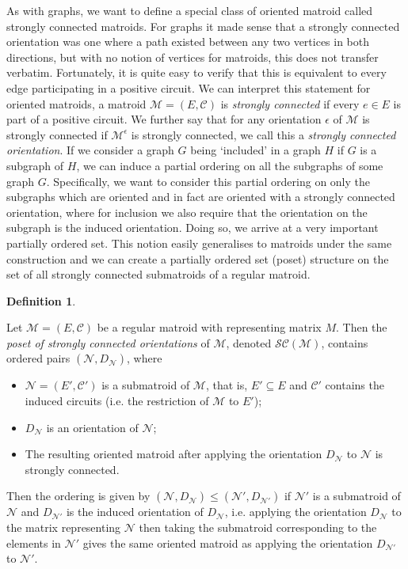 \documentclass[12pt]{report}
\theoremstyle{definition}
\newtheorem{definition}[theorem]{Definition}
\def\calC{\mathcal C}
\def\calM{\mathcal M}
\def\calN{\mathcal N}
\def\calS{\mathcal S}
\theoremstyle{upright}
\begin{document}
As with graphs, we want to define a special class of oriented matroid called strongly connected matroids.
For graphs it made sense that a strongly connected orientation was one where a path existed between any two vertices in both directions, but with no notion of vertices for matroids, this does not transfer verbatim.
Fortunately, it is quite easy to verify that this is equivalent to every edge participating in a positive circuit.
We can interpret this statement for oriented matroids, a matroid $\calM=(E, \calC)$ is {\em strongly connected} if every $e\in E$ is part of a positive circuit.
We further say that for any orientation $\epsilon$ of $\calM$ is strongly connected if $\calM^\epsilon$ is strongly connected, we call this a {\em strongly connected orientation}.
If we consider a graph $G$ being `included' in a graph $H$ if $G$ is a subgraph of $H$, we can induce a partial ordering on all the subgraphs of some graph $G$.
Specifically, we want to consider this partial ordering on only the subgraphs which are oriented and in fact are oriented with a strongly connected orientation, where for inclusion we also require that the orientation on the subgraph is the induced orientation.
Doing so, we arrive at a very important partially ordered set.
This notion easily generalises to matroids under the same construction and we can create a partially ordered set (poset) structure on the set of all strongly connected submatroids of a regular matroid.

\begin{definition}\label{def:SCPoset}

    Let $\calM=(E, \calC)$ be a regular matroid with representing matrix $M$.
    Then the \textit{poset of strongly connected orientations} of $\calM$, denoted $\calS\calC(\calM)$, contains ordered pairs $(\calN, D_\calN)$, where

    \begin{itemize}
        \item $\calN=(E', \calC')$ is a submatroid of $\calM$, that is, $E'\subseteq E$ and $\calC'$ contains the induced circuits (i.e. the restriction of $\calM$ to $E'$);
        \item $D_\calN$ is an orientation of $\calN$;
        \item The resulting oriented matroid after applying the orientation $D_\calN$ to $\calN$ is strongly connected.
    \end{itemize}

    Then the ordering is given by $(\calN, D_\calN)\leq(\calN', D_{\calN'})$ if $\calN'$ is a submatroid of $\calN$ and $D_{\calN'}$ is the induced orientation of $D_\calN$, i.e. applying the orientation $D_\calN$ to the matrix representing $\calN$ then taking the submatroid corresponding to the elements in $\calN'$ gives the same oriented matroid as applying the orientation $D_{\calN'}$ to $\calN'$.
    
\end{definition}
\end{document}
